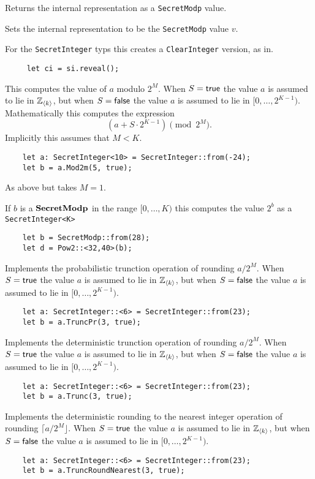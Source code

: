 Returns the internal representation as a \verb|SecretModp| value.

Sets the internal representation to be the \verb|SecretModp| value $v$.

For the \verb|SecretInteger| typs this creates a \verb|ClearInteger| version, as in.
\begin{lstlisting}
     let ci = si.reveal();
\end{lstlisting}

This computes the value of $a$ modulo $2^M$.
When $S={\mathsf{true}}$ the value $a$ is assumed to lie in ${\mathbb{Z}}_{\langle k \rangle}$,
but when $S={\mathsf{false}}$ the value $a$ is assumed to lie in $[0,\ldots,2^{K-1})$.
Mathematically this computes the expression
\[  \left( a + S \cdot 2^{K-1} \right) \pmod 2^M. \]
Implicitly this assumes that $M < K$.
\begin{lstlisting}
    let a: SecretInteger<10> = SecretInteger::from(-24);
    let b = a.Mod2m(5, true);
\end{lstlisting}

As above but takes $M=1$.

If $b$ is a $\mathbf{SecretModp}$ in the range $[0,\ldots,K)$ this computes
the value $2^b$ as a \verb|SecretInteger<K>|
\begin{lstlisting}
    let b = SecretModp::from(28);
    let d = Pow2::<32,40>(b);
\end{lstlisting}

Implements the probabilistic trunction operation of rounding $a/2^M$.
When $S={\mathsf{true}}$ the value $a$ is assumed to lie in ${\mathbb{Z}}_{\langle k \rangle}$,
but when $S={\mathsf{false}}$ the value $a$ is assumed to lie in $[0,\ldots,2^{K-1})$.
\begin{lstlisting}
    let a: SecretInteger::<6> = SecretInteger::from(23);
    let b = a.TruncPr(3, true);
\end{lstlisting}

Implements the deterministic trunction operation of rounding $a/2^M$.
When $S={\mathsf{true}}$ the value $a$ is assumed to lie in ${\mathbb{Z}}_{\langle k \rangle}$,
but when $S={\mathsf{false}}$ the value $a$ is assumed to lie in $[0,\ldots,2^{K-1})$.
\begin{lstlisting}
    let a: SecretInteger::<6> = SecretInteger::from(23);
    let b = a.Trunc(3, true);
\end{lstlisting}

Implements the deterministic rounding to the nearest integer operation
of rounding $\lceil a/2^M \rfloor$.
When $S={\mathsf{true}}$ the value $a$ is assumed to lie in ${\mathbb{Z}}_{\langle k \rangle}$,
but when $S={\mathsf{false}}$ the value $a$ is assumed to lie in $[0,\ldots,2^{K-1})$.
\begin{lstlisting}
    let a: SecretInteger::<6> = SecretInteger::from(23);
    let b = a.TruncRoundNearest(3, true);
\end{lstlisting}

